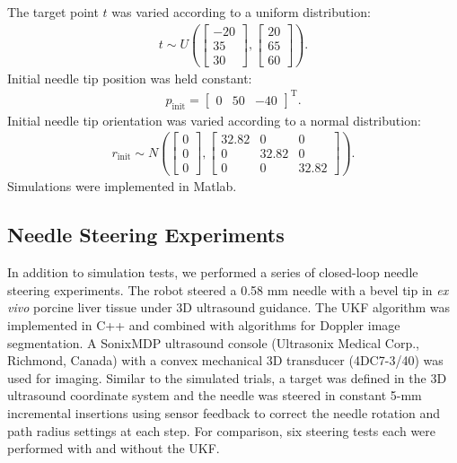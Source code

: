 The target point ${t}$ was varied according to a uniform distribution:
\begin{align}
{t} \sim U\left(
\begin{bmatrix} -20\\ 35\\ 30 \end{bmatrix},
\begin{bmatrix} 20\\ 65\\ 60 \end{bmatrix} \right).
\end{align}
Initial needle tip position was held constant: 
\begin{align*}
{p_{\text{init}}} = \begin{bmatrix} 0 & 50 & -40 \end{bmatrix}^{\text{T}}.
\end{align*}
Initial needle tip orientation was varied according to a normal distribution:
\begin{align}
{r_{\text{init}}} \sim N\left(
\begin{bmatrix} 0\\ 0\\ 0 \end{bmatrix},
\begin{bmatrix} 32.82 & 0 & 0\\ 0 & 32.82 & 0\\ 0 & 0 & 32.82 \end{bmatrix} \right).
\end{align}
Simulations were implemented in Matlab.

\subsection{Needle Steering Experiments}
In addition to simulation tests, we performed a series of closed-loop needle steering experiments. The robot steered a 0.58 mm needle with a bevel tip in \textit{ex vivo} porcine liver tissue under 3D ultrasound guidance. The UKF algorithm was implemented in C++ and combined with algorithms for Doppler image segmentation. A SonixMDP ultrasound console (Ultrasonix Medical Corp., Richmond, Canada) with a convex mechanical 3D transducer (4DC7-3/40) was used for imaging. Similar to the simulated trials, a target was defined in the 3D ultrasound coordinate system and the needle was steered in constant 5-mm incremental insertions using sensor feedback to correct the needle rotation and path radius settings at each step. For comparison, six steering tests each were performed with and without the UKF.

